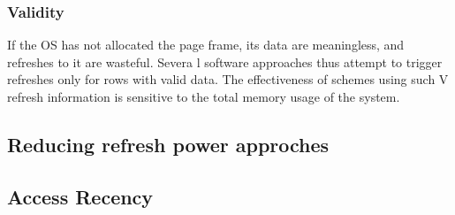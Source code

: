 \subsubsection*{\textbf{Validity}}
If the OS has not allocated the page frame, its data are meaningless, and refreshes to it are wasteful. Severa
l software approaches thus attempt to trigger refreshes only for rows with valid data. The effectiveness of schemes using such V refresh information is sensitive to the total memory usage of the system.

\subsection{Reducing refresh power approches}


\subsection{Access Recency}